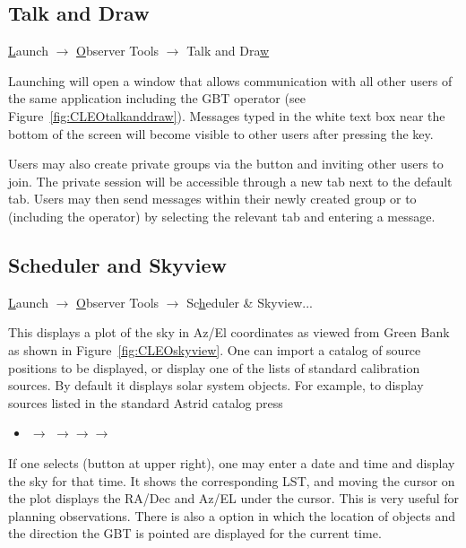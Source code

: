 \newpage

\subsection{Talk and Draw}\label{sec:talkanddraw}
{\btt \underline{L}aunch} $\rightarrow$ {\btt \underline{O}bserver
Tools} $\rightarrow$ {\btt Talk and Dra\underline{w}}

Launching  will open a window that allows communication
with all other users of the same application including the \gls{GBT} operator
(see Figure~\ref{fig:CLEOtalkanddraw}). Messages typed in the white text box
near the bottom of the screen will become visible to other users after pressing
the  key.

Users may also create private groups via the  button and
inviting other users to join.  The private session will be accessible through a new
tab next to the default  tab.  Users may then send messages within
their newly created group or to  (including the operator) by selecting
the relevant tab and entering a message.



\subsection{Scheduler and Skyview}\label{sec:cleo_scheduler}
{\btt \underline{L}aunch} $\rightarrow$ {\btt \underline{O}bserver
Tools} $\rightarrow$ {\btt Sc\underline{h}eduler \& Skyview...}

This displays a plot of the sky in Az/El coordinates as viewed from Green Bank as
shown in Figure~\ref{fig:CLEOskyview}.   One can import a catalog of source positions
to be displayed, or display one of the lists of standard calibration sources.
By default it displays solar system objects. For example, to display sources listed in
the standard \gls{Astrid}  catalog press

\begin{itemize}[leftmargin=*]
\item {}$\rightarrow$%
$\rightarrow$$\rightarrow$$\rightarrow$
\end{itemize}

If one selects  (button at upper right), one may enter a date and time
and display the sky for that time.  It shows the corresponding \gls{LST}, and moving
the cursor on the plot displays the RA/Dec and Az/EL under the cursor. This is very
useful for planning observations. There is also a  option in which the
location of objects and the direction the \gls{GBT} is pointed are displayed for the
current time.


